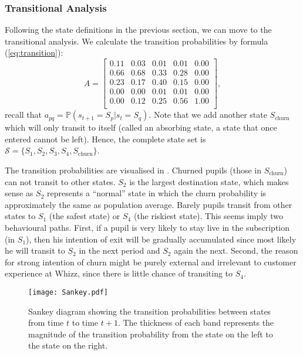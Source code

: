 \subsubsection{Transitional Analysis}

Following the state definitions in the previous section, we can move to the transitional analysis. We calculate the transition probabilities by formula (\ref{eq:transition}):
\begin{equation}
A = 
\begin{bmatrix}
0.11 & 0.03 & 0.01 & 0.01 & 0.00 \\
0.66 & 0.68 & 0.33 & 0.28 & 0.00 \\
0.23 & 0.17 & 0.40 & 0.15 & 0.00 \\
0.00 & 0.00 & 0.01 & 0.01 & 0.00 \\
0.00 & 0.12 & 0.25 & 0.56 & 1.00 \\
\end{bmatrix},
\end{equation}
recall that $a_{pq} = \mathbb{P} (s_{t+1} = S_p | s_t = S_q)$. Note that we add another state $S_\text{churn}$ which will only transit to itself (called an absorbing state, a state that once entered cannot be left). Hence, the complete state set is $\mathcal{S} = \{S_1, S_2, S_3, S_4, S_\text{churn}\}$.

The transition probabilities are visualised in . Churned pupils (those in $S_\text{churn}$) can not transit to other states. $S_2$ is the largest destination state, which makes sense as $S_2$ represents a ``normal'' state in which the churn probability is approximately the same as population average. Barely pupils transit from other states to $S_1$ (the safest state) or $S_4$ (the riskiest state). This seems imply two behavioural paths. First, if a pupil is very likely to stay live in the subscription (in $S_1$), then his intention of exit will be gradually accumulated since most likely he will transit to $S_2$ in the next period and $S_2$ again the next. Second, the reason for strong intention of churn might be purely external and irrelevant to customer experience at Whizz, since there is little chance of transiting to $S_4$.

\begin{figure}[!h]
\centering
\texttt{[image: Sankey.pdf]}
\caption{Sankey diagram showing the transition probabilities between states from time $t$ to time $t+1$. The thickness of each band represents the magnitude of the transition probability from the state on the left to the state on the right.}
\label{fig:sankey}
\end{figure}

